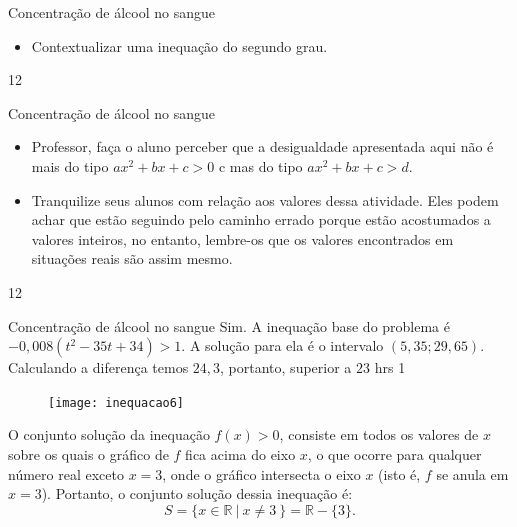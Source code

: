 \clearpage
\def\currentcolor{session2}
\begin{objectives}{Concentração de álcool no sangue}
{
\begin{itemize}
\item Contextualizar uma inequação do segundo grau.
\end{itemize}
}{1}{2}
\end{objectives}
\begin{sugestions}{Concentração de álcool no sangue}
{
\begin{itemize}
\item Professor, faça o aluno perceber que a desigualdade apresentada aqui não é mais do tipo $ax^2+bx+c>0$ c mas do tipo $ax^2+bx+c>d$.
\item Tranquilize seus alunos com relação aos valores dessa atividade. Eles podem achar que estão seguindo pelo caminho errado porque estão acostumados a valores inteiros, no entanto, lembre-os que os valores encontrados em situações reais são assim mesmo.  
\end{itemize}
}{1}{2}
\end{sugestions}
\begin{answer}{Concentração de álcool no sangue}
{
Sim. A inequação base do problema é $-0{,}008(t^2-35t + 34)>1.$ A solução para ela é o intervalo $(5{,}35;29{,}65)$. Calculando a diferença temos $24{,}3$, portanto, superior a $23$ hrs
}{1}
\end{answer}
\begin{figure}[H]
\centering
\noindent\texttt{[image: inequacao6]}
\end{figure}
O conjunto solução da inequação $f(x) > 0$, consiste em todos os valores de $x$ sobre os quais o gráfico de $f$ fica acima do eixo $x$, o que ocorre para qualquer número real exceto $x = 3$, onde o gráfico intersecta o eixo $x$ (isto é, $f$ se anula em $x = 3$). Portanto, o conjunto solução dessia inequação é:
$$
S = \{x \in \mathbb{R} \ | \ x \neq 3\ \} = \mathbb{R} - \{3\}.
$$

\label{\detokenize{AF107-8:inequacoes-grau2}}\label{\detokenize{AF107-8::doc}}


